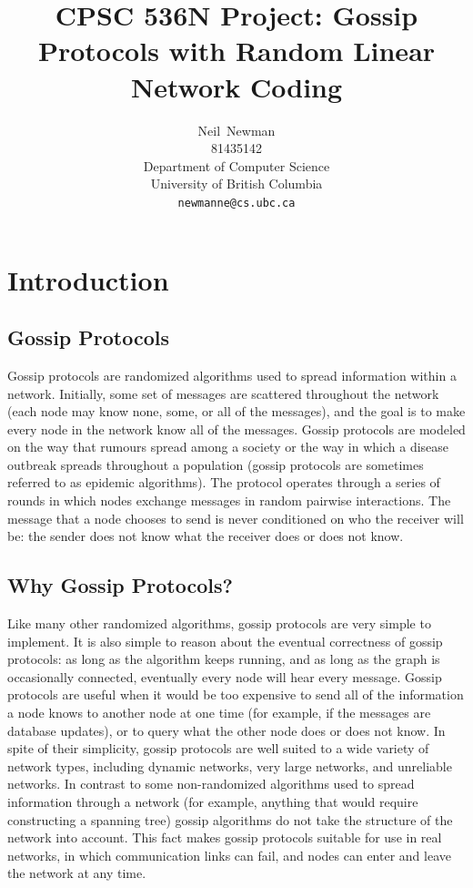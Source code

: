 \documentclass{article} %
\title{CPSC 536N Project: Gossip Protocols with Random Linear Network Coding}
\author{
Neil~Newman\\
81435142\\
Department of Computer Science\\
University of British Columbia\\
\texttt{newmanne@cs.ubc.ca}
}
\begin{document}
\maketitle

\section{Introduction}
\subsection{Gossip Protocols}
Gossip protocols are randomized algorithms used to spread information within a network. Initially, some set of messages are scattered throughout the network (each node may know none, some, or all of the messages), and the goal is to make every node in the network know all of the messages. Gossip protocols are modeled on the way that rumours spread among a society or the way in which a disease outbreak spreads throughout a population (gossip protocols are sometimes referred to as epidemic algorithms). The protocol operates through a series of rounds in which nodes exchange messages in random pairwise interactions. The message that a node chooses to send is never conditioned on who the receiver will be: the sender does not know what the receiver does or does not know.

\subsection{Why Gossip Protocols?}
Like many other randomized algorithms, gossip protocols are very simple to implement. It is also simple to reason about the eventual correctness of gossip protocols: as long as the algorithm keeps running, and as long as the graph is occasionally connected, eventually every node will hear every message. Gossip protocols are useful when it would be too expensive to send all of the information a node knows to another node at one time (for example, if the messages are database updates), or to query what the other node does or does not know. In spite of their simplicity, gossip protocols are well suited to a wide variety of network types, including dynamic networks, very large networks, and unreliable networks. In contrast to some non-randomized algorithms used to spread information through a network (for example, anything that would require constructing a spanning tree) gossip algorithms do not take the structure of the network into account. This fact makes gossip protocols suitable for use in real networks, in which communication links can fail, and nodes can enter and leave the network at any time. 
\end{document}

